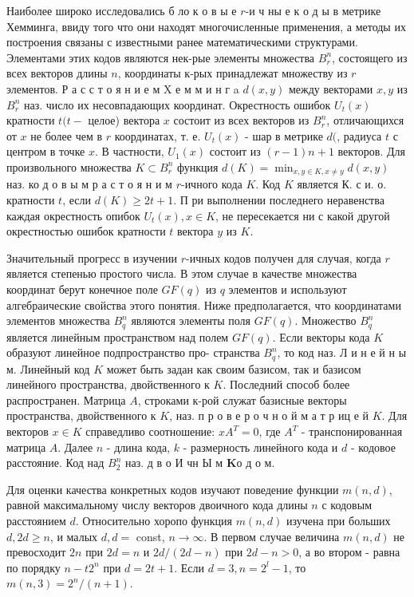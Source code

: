 \documentclass[10pt]{article}
\begin{document}
Наиболее широко исследовались б ло к о в ы е $r$-и ч ны е к о д ы в метрике Хемминга, ввиду того что они находят многочисленные применения, а методы их построения связаны с известными ранее математическими структурами. Элементами этих кодов являются нек-рые элементы множества $B_{r}^{n}$, состоящего из всех векторов длины $n$, координаты к-рых принадлежат множеству из $r$ элементов. Р а с с т о я н и е м $\mathrm{X}$ е м м и н г a $d(x, y)$ между векторами $x, y$ из $B_{r}^{n}$ наз. число их несовпадающих координат. Окрестность ошибок $U_{t}(x)$ кратности $t(t-$ целое) вектора $x$ состоит из всех векторов из $B_{r}^{n}$, отличающихся от $x$ не более чем в $r$ координатах, т. е. $U_{t}(x)$ - шар в метрике $d($, радиуса $t$ с центром в точке $x$. В частности, $U_{1}(x)$ состоит из $(r-1) n+1$ векторов. Для произвольного множества $K \subset B_{r}^{n}$ функция $d(K)=\min _{x, y \in K, x \neq y} d(x, y)$ наз. ко д о в ы м р а с т о я н и м $r$-ичного кода $K$. Код $K$ является К. с и. о. кратности $t$, если $d(K) \geqslant 2 t+1$. П ри выполнении последнего неравенства каждая окрестность опибок $U_{t}(x), x \in K$, не пересекается ни с какой другой окрестностью ошибок кратности $t$ вектора $y$ из $K$.



Значительный прогресс в изучении $r$-ичных кодов получен для случая, когда $r$ является степенью простого числа. В этом случае в качестве множества координат берут конечное поле $G F(q)$ из $q$ элементов и используют алгебраические свойства этого понятия. Ниже предполагается, что координатами элементов множества $B_{q}^{n}$ являются элементы поля $G F(q)$. Множество $B_{q}^{n}$ является линейным пространством над полем $G F(q)$. Если векторы кода $K$ образуют линейное подпространство про- странства $B_{q}^{n}$, то код наз. Л и н е й н ы м. Линейный код $K$ может быть задан как своим базисом, так и базисом линейного пространства, двойственного к $K$. Последний способ более распространен. Матрица $A$, строками к-рой служат базисные векторы пространства, двойственного к $K$, наз. п р о в е р о ч н о й м а т р иц е й $K$. Для векторов $x \in K$ справедливо соотношение: $x A^{T}=0$, где $A^{T}$ - транспонированная матрица $A$. Далее $n$ - длина кода, $k$ - размерность линейного кода и $d$ - кодовое расстояние. Код над $B_{2}^{n}$ наз. д в о И чн Ы м $\mathbf{K} о$ д о м.



Для оценки качества конкретных кодов изучают поведение функции $m(n, d)$, равной максимальному числу векторов двоичного кода длины $n$ с кодовым расстоянием $d$. Относительно хоропо функция $m(n, d)$ изучена при больших $d, 2 d \geqslant n$, и малых $d, d=$ const, $n \rightarrow \infty$. В первом случае величина $m(n, d)$ не превосходит $2 n$ при $2 d=n$ и $2 d /(2 d-n)$ при $2 d-n>0$, а во втором - равна по порядку $n-t 2^{n}$ при $d=2 t+1$. Если $d=3, n=2^{l}-1$, то $m(n, 3)=2^{n} /(n+1)$.
\end{document}
